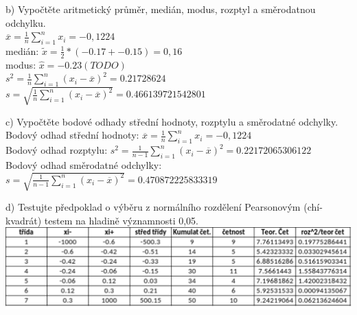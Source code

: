 \documentclass[11pt,a4paper]{article}
\begin{document}
\noindent\makebox[\linewidth]{\rule{\textwidth}{0.4pt}}

b) Vypočtěte aritmetický průměr, medián, modus, rozptyl a směrodatnou odchylku. \\

$ \overline{x} = \frac{1}{n} \sum\limits_{i=1}^n x_i = -0,1224$ \\

medián: $  \widetilde{x} = \frac{1}{2}*(-0.17 + -0.15) = 0,16 $ \\

modus: $ \widehat{x} = -0.23 (TODO) $ \\

$ s^2 = \frac{1}{n} \sum\limits_{i=1}^{n} (x_i - \overline{x})^2 = 0.21728624 $ \\

$ s = \sqrt{\frac{1}{n} \sum\limits_{i=1}^n (x_i - \overline{x})^2} = 0.466139721542801$ \\


\noindent\makebox[\linewidth]{\rule{\textwidth}{0.4pt}}

c) Vypočtěte bodové odhady střední hodnoty, rozptylu a směrodatné odchylky. \\

Bodový odhad střední hodnoty: $ \overline{x} = \frac{1}{n} \sum\limits_{i=1}^{n} x_i = -0,1224 $ \\

Bodový odhad rozptylu: $ s^2 = \frac{1}{n - 1} \sum\limits_{i=1}^{n} (x_i - \overline{x})^2 = 0.22172065306122 $ \\

Bodový odhad směrodatné odchylky: $ s = \sqrt{ \frac{1}{n - 1} \sum\limits_{i=1}^{n} (x_i - \overline{x})^2 } = 0.470872225833319 $ \\


\noindent\makebox[\linewidth]{\rule{\textwidth}{0.4pt}}

d) Testujte předpoklad o výběru z normálního rozdělení Pearsonovým (chí-kvadrát) testem na hladině významnosti 0,05. \\

\vspace{0.6cm}\includegraphics[width=\textwidth]{img/1dtable.pdf} \\
\end{document}
